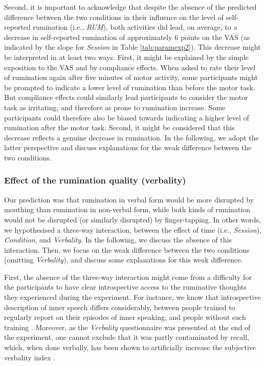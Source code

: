 \documentclass[12pt,]{book}
\begin{document}
Second, it is important to acknowledge that despite the absence of the
predicted difference between the two conditions in their influence on
the level of self-reported rumination (i.e., \emph{RUM}), both
activities did lead, on average, to a decrease in self-reported
rumination of approximately 6 points on the VAS (as indicated by the
slope for \emph{Session} in Table \ref{tab:paramexp2}). This decrease
might be interpreted in at least two ways. First, it might be explained
by the simple exposition to the VAS and by compliance effects. When
asked to rate their level of rumination again after five minutes of
motor activity, some participants might be prompted to indicate a lower
level of rumination than before the motor task. But compliance effects
could similarly lead participants to consider the motor task as
irritating, and therefore as prone to rumination increase. Some
participants could therefore also be biased towards indicating a higher
level of rumination after the motor task. Second, it might be considered
that this decrease reflects a genuine decrease in rumination. In the
following, we adopt the latter perspective and discuss explanations for
the weak difference between the two conditions.

\subsubsection{Effect of the rumination quality
(verbality)}\label{effect-of-the-rumination-quality-verbality}

Our prediction was that rumination in verbal form would be more
disrupted by mouthing than rumination in non-verbal form, while both
kinds of rumination would not be disrupted (or similarly disrupted) by
finger-tapping. In other words, we hypothesised a three-way interaction,
between the effect of time (i.e., \emph{Session}), \emph{Condition}, and
\emph{Verbality}. In the following, we discuss the absence of this
interaction. Then, we focus on the weak difference between the two
conditions (omitting \emph{Verbality}), and discuss some explanations
for this weak difference.

First, the absence of the three-way interaction might come from a
difficulty for the participants to have clear introspective access to
the ruminative thoughts they experienced during the experiment. For
instance, we know that introspective description of inner speech differs
considerably, between people trained to regularly report on their
episodes of inner speaking, and people without such training
\citep[e.g.,][]{Hurlburt2013}. Moreover, as the \emph{Verbality}
questionnaire was presented at the end of the experiment, one cannot
exclude that it was partly contaminated by recall, which, when done
verbally, has been shown to artificially increase the subjective
verbality index \citep{Hurlburt2011}.
\end{document}
